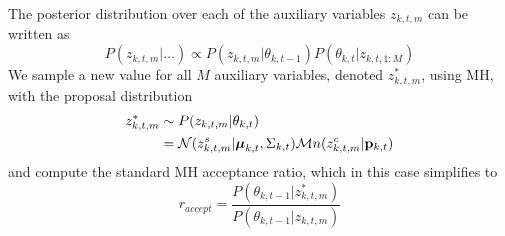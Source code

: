 \documentclass[twocolumn, final]{svjour3}
\newcommand{\willie}[1]{\textcolor{green}{\textsf{\emph{\textbf{\textcolor{green}{#1}}}}}}
\begin{document}
The posterior distribution over each of the auxiliary variables $z_{k,t,m}$ can be written as
\begin{equation}
\label{stationary_pdf}
P(z_{k,t,m} | \ldots) \propto  P(z_{k,t,m} | \theta_{k,t-1}) P(\theta_{k,t} | z_{k,t,1:M})
\end{equation}
%
%
%
%
We sample a new value for all $M$ auxiliary variables, denoted $z_{k,t,m}^{*}$, using MH, with the proposal distribution
\begin{align}
\begin{split}
\label{proposal_distro}
z_{k,t,m}^{*}  &\sim  P(z_{k,t,m} | \theta_{k,t}) \\
&= \mathcal{N}(z_{k,t,m}^{s} | \boldsymbol{\mu}_{k,t}, \Sigma_{k,t}) \mathcal{M}n(z_{k,t,m}^{c} | \bold{p}_{k,t})
\end{split}
\end{align}
and compute the standard MH acceptance ratio, which in this case simplifies to 
\begin{equation}
\label{accept_ratio}
r_{accept} = \frac{P(\theta_{k,t-1} | z_{k,t,m}^{*})}{P(\theta_{k,t-1} | z_{k,t,m})}
\end{equation}
\end{document}
